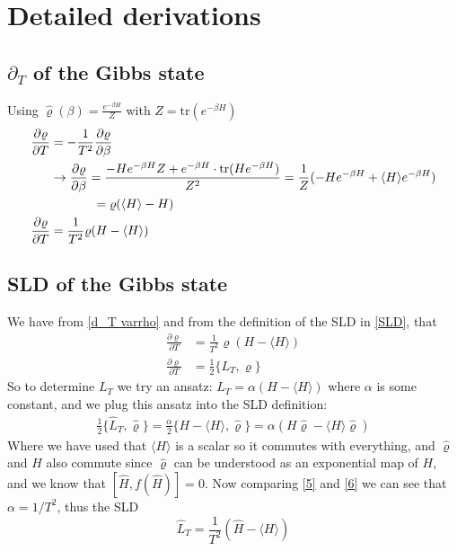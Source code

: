 \chapter{Detailed derivations}
\setcounter{equation}{0}
\renewcommand{\theequation}{A.\arabic{equation}}
\section{$\partial_T$ of the Gibbs state}\label{d_T varrho}

Using $\hat\varrho(\beta)=\frac{e^{-\beta H}}{Z}$ with $Z = \text{tr}(e^{-\beta H})$
\begin{align}
    \frac{\partial\varrho}{\partial T}&=-\frac{1}{T^2}\frac{\partial\varrho}{\partial \beta}\\
    &\rightarrow  \frac{\partial\varrho}{\partial \beta}=\frac{-He^{-\beta H}Z+e^{-\beta H}\cdot\text{tr}(He^{-\beta H})}{Z^2}=\frac{1}{Z}(-He^{-\beta H}+\langle H \rangle e^{-\beta H}) \\ 
    &\hspace{1.2cm}= {\varrho} (\langle H \rangle-H)\\
    \frac{\partial\varrho}{\partial T}&=\frac{1}{T^2}\varrho(H-\langle H \rangle) 
\end{align}

\section{SLD of the Gibbs state}\label{SLD derivation}

We have from \eqref{d_T varrho} and from the definition of the SLD in \eqref{SLD}, that
\begin{align}\label{5}
    \frac{\partial\varrho}{\partial T}&=\frac{1}{T^2}\varrho(H-\langle H \rangle)\\ \label{6}
    \frac{\partial\varrho}{\partial T}&=\frac{1}{2}\{L_T,\varrho\}
\end{align}
So to determine $L_T$ we try an ansatz: $L_T = \alpha(H-\langle H \rangle)$ where $\alpha$ is some constant, and we plug this ansatz into the SLD definition:
\begin{align}
    \frac{1}{2}\{\hat L_T,\hat\varrho\}=\frac{\alpha}{2}\{H-\langle H \rangle , \hat\varrho\}=\alpha(H\hat\varrho-\langle H \rangle\hat\varrho)
\end{align}
Where we have used that $\langle H \rangle$ is a scalar so it commutes with everything, and $\hat\varrho$ and $H$ also commute since $\hat\varrho$ can be understood as an exponential map of $H$, and we know that $[\hat{H}, f(\hat{H})]=0$. Now comparing \eqref{5} and \eqref{6} we can see that $\alpha=1/T^2$, thus the SLD 
\begin{equation}
    \hat L_T=\frac{1}{T^2}(\hat{H}-\langle H \rangle )
\end{equation}

